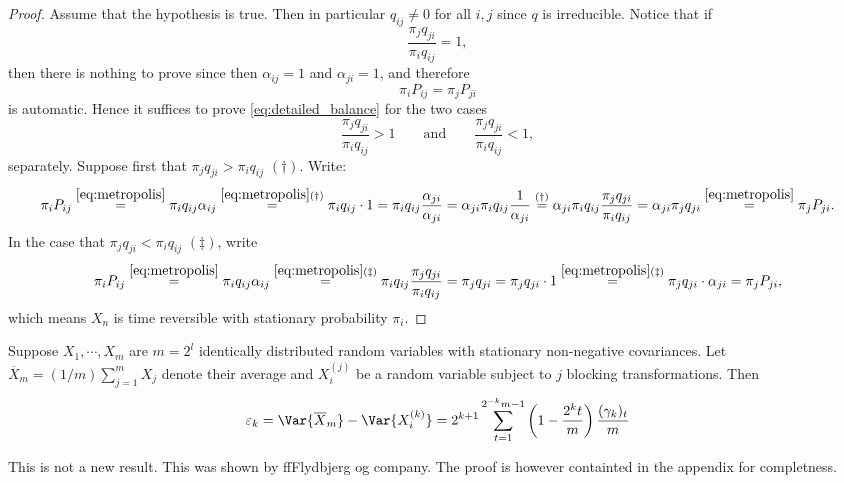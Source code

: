 \documentclass[11pt,english,a4paper]{article}
\begin{document}
\begin{proof}
Assume that the hypothesis is true. Then in particular $q_{  ij} \neq 0$ for all $i,j$ since $q$ is irreducible. Notice that if 
\[
\frac{\pi_j q_{  ji}}{\pi_i q_{  ij}} = 1,
\]
then there is nothing to prove since then $\alpha_{ij} = 1$ and $\alpha_{ji} = 1$, and therefore
\begin{equation}
\pi_iP_{  ij} = \pi_jP_{  ji} \label{eq:detailed_balance}
\end{equation} 
is automatic. Hence it suffices to prove \eqref{eq:detailed_balance} for the two cases
\[
\frac{\pi_j q_{  ji}}{\pi_i q_{  ij}} > 1 \qquad \text{and} \qquad \frac{\pi_j q_{  ji}}{\pi_i q_{  ij}} < 1,
\]
separately. Suppose first that $\pi_j q_{  ji} > \pi_i q_{  ij}$ $(\dagger)$. Write:
\[
\pi_iP_{  ij} \stackrel{\eqref{eq:metropolis}}{=} \pi_i  q_{  ij} \alpha_{  ij} \stackrel{\eqref{eq:metropolis}(\dagger)}{=} \pi_i q_{  ij} \cdot 1 =
\pi_i q_{  ij}  \frac{\alpha_{  ji}}{\alpha_{  ji}} = \alpha_{  ji}\pi_i q_{  ij}  \frac{1}{\alpha_{  ji}} \stackrel{(\dagger)}{=} \alpha_{  ji}\pi_i q_{  ij}  \frac{\pi_j q_{  ji}}{\pi_i q_{  ij}} = \alpha_{  ji}  \pi_j q_{  ji} \stackrel{\eqref{eq:metropolis}}{=} \pi_jP_{  ji}. 
\]
In the case that $\pi_j q_{  ji} < \pi_i q_{  ij}$ $(\ddagger)$, write
\[
\pi_iP_{  ij} \stackrel{\eqref{eq:metropolis}}{=} \pi_i  q_{  ij} \alpha_{  ij} \stackrel{\eqref{eq:metropolis}(\ddagger)}{=} \pi_i q_{  ij} \frac{\pi_j q_{  ji}}{\pi_i q_{  ij}} = \pi_j q_{  ji} = \pi_j q_{  ji} \cdot 1 \stackrel{\eqref{eq:metropolis}(\ddagger)}{=} \pi_j q_{  ji} \cdot \alpha_{  ji} = \pi_jP_{  ji},
\]
which means $X_n$ is time reversible with stationary probability $\pi_i$.
\end{proof}
\begin{prop*}
Suppose $X_1,\cdots, X_m$ are $m = 2^l$ identically distributed random variables with stationary non-negative covariances. Let $\overline X_m = (1/m)\sum_{j=1}^m X_j$ denote their average and $X^{(j)}_i$ be a random variable subject to $j$ blocking transformations. Then
\[
\varepsilon_k = \Var{\overline X_m} - \Var{X^{(k)}_i} = 2^{k+1} \sum_{t=1}^{2^{-k}m-1} \left( 1 - \frac{2^{k}t}{m} \right) \frac{(\gamma_k)_t}{m}
\]
\end{prop*}
This is not a new result. This was shown by ffFlydbjerg og company. The proof is however containted in the appendix for completness.
\end{document}
